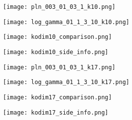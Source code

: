 \begin{figure}
  \centering
  \texttt{[image: pln\_003\_01\_03\_1\_k10.png]}
\end{figure}
\begin{figure}
  \centering
  \texttt{[image: log\_gamma\_01\_1\_3\_10\_k10.png]}
\end{figure}
\begin{figure}
  \centering
  \texttt{[image: kodim10\_comparison.png]}
\end{figure}
\begin{figure}
  \centering
  \texttt{[image: kodim10\_side\_info.png]}
\end{figure}

\begin{figure}
  \centering
  \texttt{[image: pln\_003\_01\_03\_1\_k17.png]}
\end{figure}
\begin{figure}
  \centering
  \texttt{[image: log\_gamma\_01\_1\_3\_10\_k17.png]}
\end{figure}
\begin{figure}
  \centering
  \texttt{[image: kodim17\_comparison.png]}
\end{figure}
\begin{figure}
  \centering
  \texttt{[image: kodim17\_side\_info.png]}
\end{figure}
